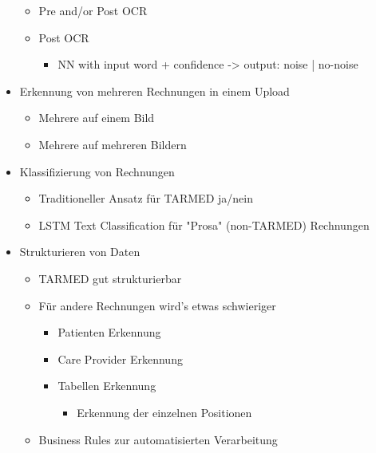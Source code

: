 \documentclass[12pt, twoside]{extarticle}
\begin{document}
\begin{itemize}
    \begin{itemize}
	    \item Pre and/or Post OCR
        \item Post OCR
        \begin{itemize}
	    	\item NN with input word + confidence -> output: noise | no-noise
        \end{itemize}
    \end{itemize}
    \item Erkennung von mehreren Rechnungen in einem Upload
    \begin{itemize}
	    \item Mehrere auf einem Bild
	    \item Mehrere auf mehreren Bildern
    \end{itemize}
    \item Klassifizierung von Rechnungen
    \begin{itemize}
		\item Traditioneller Ansatz für TARMED ja/nein
		\item LSTM Text Classification für "Prosa" (non-TARMED) Rechnungen
    \end{itemize}
    \item Strukturieren von Daten
    \begin{itemize}
		\item TARMED gut strukturierbar
		\item Für andere Rechnungen wird’s etwas schwieriger
        \begin{itemize}
			\item Patienten Erkennung
			\item Care Provider Erkennung
			\item Tabellen Erkennung
            \begin{itemize}
			    \item Erkennung der einzelnen Positionen
            \end{itemize}
        \end{itemize}
        \item Business Rules zur automatisierten Verarbeitung    
    \end{itemize}  
\end{itemize}
\end{document}
